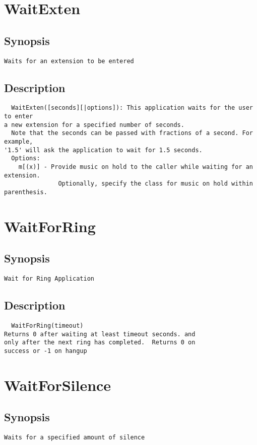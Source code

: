 \section{WaitExten}
\subsection{Synopsis}
\begin{verbatim}
Waits for an extension to be entered
\end{verbatim}
\subsection{Description}
\begin{verbatim}
  WaitExten([seconds][|options]): This application waits for the user to enter
a new extension for a specified number of seconds.
  Note that the seconds can be passed with fractions of a second. For example,
'1.5' will ask the application to wait for 1.5 seconds.
  Options:
    m[(x)] - Provide music on hold to the caller while waiting for an extension.
               Optionally, specify the class for music on hold within parenthesis.

\end{verbatim}


\section{WaitForRing}
\subsection{Synopsis}
\begin{verbatim}
Wait for Ring Application
\end{verbatim}
\subsection{Description}
\begin{verbatim}
  WaitForRing(timeout)
Returns 0 after waiting at least timeout seconds. and
only after the next ring has completed.  Returns 0 on
success or -1 on hangup

\end{verbatim}


\section{WaitForSilence}
\subsection{Synopsis}
\begin{verbatim}
Waits for a specified amount of silence
\end{verbatim}
